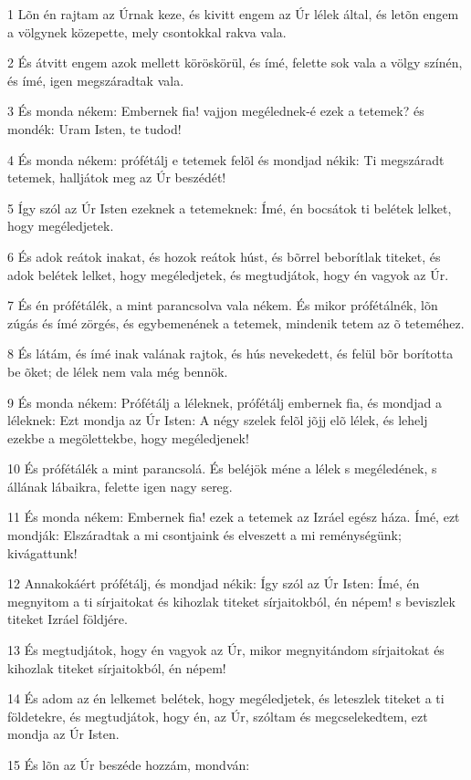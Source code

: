 \par 1 Lõn én rajtam az Úrnak keze, és kivitt engem az Úr lélek által, és letõn engem a völgynek közepette, mely csontokkal rakva vala.
\par 2 És átvitt engem azok mellett köröskörül, és ímé, felette sok vala a völgy színén, és ímé, igen megszáradtak vala.
\par 3 És monda nékem: Embernek fia! vajjon megélednek-é ezek a tetemek? és mondék: Uram Isten, te tudod!
\par 4 És monda nékem: prófétálj e tetemek felõl és mondjad nékik: Ti megszáradt tetemek, halljátok meg az Úr beszédét!
\par 5 Így szól az Úr Isten ezeknek a tetemeknek: Ímé, én bocsátok ti belétek lelket, hogy megéledjetek.
\par 6 És adok reátok inakat, és hozok reátok húst, és bõrrel beborítlak titeket, és adok belétek lelket, hogy megéledjetek, és megtudjátok, hogy én vagyok az Úr.
\par 7 És én prófétálék, a mint parancsolva vala nékem. És mikor prófétálnék, lõn zúgás és ímé zörgés, és egybemenének a tetemek, mindenik tetem az õ teteméhez.
\par 8 És látám, és ímé inak valának rajtok, és hús nevekedett, és felül bõr borította be õket; de lélek nem vala még bennök.
\par 9 És monda nékem: Prófétálj a léleknek, prófétálj embernek fia, és mondjad a léleknek: Ezt mondja az Úr Isten: A négy szelek felõl jõjj elõ lélek, és lehelj ezekbe a megölettekbe, hogy megéledjenek!
\par 10 És prófétálék a mint parancsolá. És beléjök méne a lélek s megéledének, s állának lábaikra, felette igen nagy sereg.
\par 11 És monda nékem: Embernek fia! ezek a tetemek az Izráel egész háza. Ímé, ezt mondják: Elszáradtak a mi csontjaink és elveszett a mi reménységünk; kivágattunk!
\par 12 Annakokáért prófétálj, és mondjad nékik: Így szól az Úr Isten: Ímé, én megnyitom a ti sírjaitokat és kihozlak titeket sírjaitokból, én népem! s beviszlek titeket Izráel földjére.
\par 13 És megtudjátok, hogy én vagyok az Úr, mikor megnyitándom sírjaitokat és kihozlak titeket sírjaitokból, én népem!
\par 14 És adom az én lelkemet belétek, hogy megéledjetek, és leteszlek titeket a ti földetekre, és megtudjátok, hogy én, az Úr, szóltam és megcselekedtem, ezt mondja az Úr Isten.
\par 15 És lõn az Úr beszéde hozzám, mondván:
